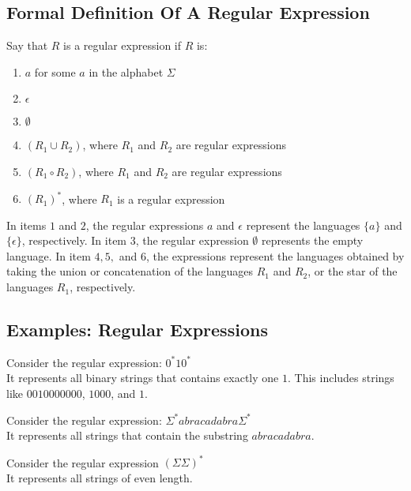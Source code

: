 \documentclass[11pt,a4paper]{article}
\begin{document}
\subsection{Formal Definition Of A Regular Expression}
\begin{definition}
    Say that $R$ is a regular expression if $R$ is:
    \begin{enumerate}
        \item $a$ for some $a$ in the alphabet $\Sigma$
        \item $\epsilon$
        \item $\emptyset$
        \item $(R_1\cup R_2)$, where $R_1$ and $R_2$ are regular expressions
        \item $(R_1\circ R_2)$, where $R_1$ and $R_2$ are regular expressions
        \item $(R_1)^*$, where $R_1$ is a regular expression
    \end{enumerate}

    In items $1$ and $2$, the regular expressions $a$ and $\epsilon$ represent the languages $\{a\}$ and $\{\epsilon\}$, respectively.
    In item 3, the regular expression $\emptyset$ represents the empty language.
    In item $4,5,$ and $6$, the expressions represent the languages obtained by taking the union or concatenation of the languages $R_1$ and $R_2$, or the star of the languages $R_1$, respectively. \\
\end{definition}

\subsection{Examples: Regular Expressions}
\begin{example}
    Consider the regular expression: $0^*10^*$ \\
    
    It represents all binary strings that contains exactly one $1$. This includes strings like $0010000000$, $1000$, and $1$.
\end{example}

\begin{example}
    Consider the regular expression: $\Sigma^* abracadabra\Sigma^*$ \\

    It represents all strings that contain the substring $abracadabra$.
\end{example}

\begin{example}
    Consider the regular expression $(\Sigma\Sigma)^*$ \\

    It represents all strings of even length.
\end{example}
\end{document}
